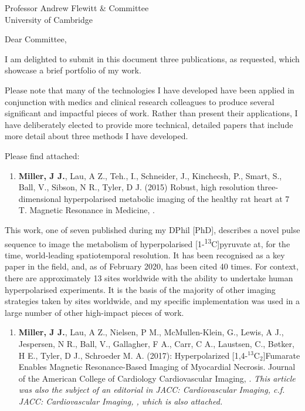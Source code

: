 \documentclass[xelatex,nofoundrysterling]{oxphysicsletter} %
\date{29th February, 2020}
\begin{document}
\begin{letter}{\vspace*{-0em}

Professor Andrew Flewitt \& Committee \\
University of Cambridge }
    \subject{Re: The Gianna Angelopoulos University Lectureship in Medical Therapeutics}
    \opening{\vspace*{-01em}Dear Committee,}  %

    I am delighted to submit in this document three publications, as requested, which showcase a brief portfolio of my work. 

    Please note that many of the technologies I have developed have been applied in conjunction with medics and clinical research colleagues to produce several significant and impactful pieces of work. Rather than present their applications, I have deliberately elected to provide more technical, detailed papers that include more detail about three methods I have developed.  

    Please find attached: 
    \begin{enumerate} 
        \item \textbf{Miller, J J.}, Lau, A Z., Teh., I., Schneider, J., Kinchecsh, P., Smart, S., Ball, V., Sibson, N R., Tyler, D J. (2015) Robust, high resolution three-dimensional hyperpolarised metabolic imaging of the healthy rat heart at 7 T. Magnetic Resonance in Medicine, .
    \end{enumerate} 

    This work, one of seven published during my DPhil [PhD], describes a novel pulse sequence to image the metabolism of hyperpolarised [1-\textsuperscript{13}C]pyruvate at, for the time, world-leading spatiotemporal resolution. It has been recognised as a key paper in the field, and, as of February 2020, has been cited 40 times. For context, there are approximately 13 sites worldwide with the ability to undertake human hyperpolarised experiments. It is the basis of the majority of other imaging strategies taken by sites worldwide, and my specific implementation was used in a large number of other high-impact pieces of work. 

    \begin{enumerate}[resume] 
    \item \textbf{Miller, J J.}, Lau, A Z., Nielsen, P M., McMullen-Klein, G., Lewis, A J.,  Jespersen, N R., Ball, V., Gallagher, F A., Carr, C A., Laustsen, C., B\o{}tker, H E., Tyler, D J., Schroeder M. A. (2017): Hyperpolarized [1,4-$^{13}$C$_2$]Fumarate Enables Magnetic Resonance-Based Imaging of Myocardial Necrosis. Journal of the American College of Cardiology Cardiovascular Imaging, . \emph{This article was also the subject of an editorial in JACC: Cardiovascular Imaging, c.f. JACC: Cardiovascular Imaging, , which is also attached.}
    \end{enumerate}  


\end{letter}
\end{document}
